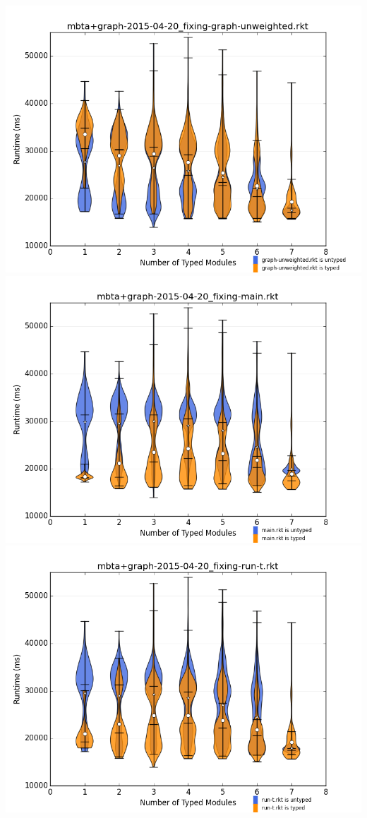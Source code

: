 \documentclass{article}
\begin{document}
\includegraphics[width=\textwidth]{mbta+graph-2015-04-20_fixing-graph-unweighted.rkt-dv.png}
\includegraphics[width=\textwidth]{mbta+graph-2015-04-20_fixing-main.rkt-dv.png}
\includegraphics[width=\textwidth]{mbta+graph-2015-04-20_fixing-run-t.rkt-dv.png}
\end{document}
